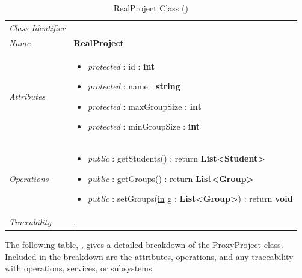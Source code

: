 \documentclass[12pt,letterpaper]{article}
\begin{document}
\begin{table}[H]
    \caption{RealProject Class ()} 
	\begin{tabu} to 
		\toprule
		Class Identifier &  \\
		Name & {\bf RealProject} \\
		Attributes & 
		\begin{minipage}[t]{\linewidth}
		    \begin{itemize}
		        \item \textit{protected} : id : {\bf int}
		        \item \textit{protected} : name : {\bf string}
		        \item \textit{protected} : maxGroupSize : {\bf int}
		        \item \textit{protected} : minGroupSize : {\bf int}
			\end{itemize}
	    \end{minipage} \\

		Operations &
		\begin{minipage}[t]{\linewidth}
			\begin{itemize}
			    \item {\it public} : getStudents() : return {\bf List<Student>}
			    \item {\it public} : getGroups() : return {\bf List<Group>}
			    \item {\it public} : setGroups(\underline{in} g : {\bf List<Group>}) : return {\bf void}
	        \end{itemize}
	    \end{minipage} \\
	    	Traceability & , \\
		\toprule
	\end{tabu}
\end{table}

The following table, , gives a detailed breakdown of the ProxyProject class. Included in the breakdown are the attributes, operations, and any traceability with operations, services, or subsystems.
\end{document}
